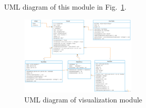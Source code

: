 \documentclass[a4paper, 10pt, conference]{ieeeconf}
\begin{document}
\begin{enumerate}
UML diagram of this module in Fig.~\ref{fig:uml}.\\
\begin{figure}[h]
    \centering
    \includegraphics[width=0.5\textwidth]{uml.png}
    \caption{UML diagram of visualization module}
    \label{fig:uml}
\end{figure}

\end{enumerate}
\end{document}
